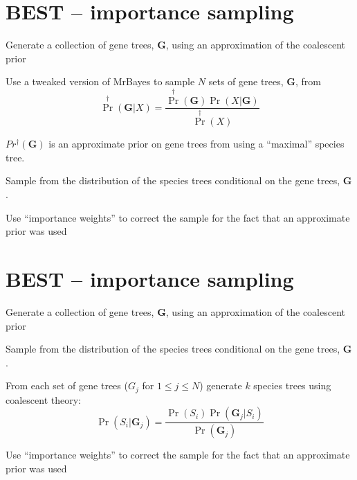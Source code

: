 \documentclass[landscape]{foils}
\begin{document}
\myNewSlide
\section*{BEST -- importance sampling}
\begin{compactenum}
	\item Generate a collection of gene trees, $\bm{G}$, using an approximation of the coalescent prior
		\begin{compactenum}
		\item Use a tweaked version of MrBayes to sample $N$ sets of gene trees, $\bm{G}$, from \[\Pr^{\dag}(\bm{G}|X) = \frac{\Pr^{\dag}(\bm{G})\Pr(X|\bm{G})}{\Pr^{\dag}(X)}\]
			\item $Pr^{\dag}(\bm{G})$ is an approximate prior on gene trees from using a ``maximal'' species tree.
		\end{compactenum}
	\item Sample from the distribution of the species trees conditional on the gene trees, $\bm{G}$.
	\item Use ``importance weights'' to correct the sample for the fact that an approximate prior was used
\end{compactenum}

\myNewSlide
\section*{BEST -- importance sampling}
\begin{compactenum}
	\item Generate a collection of gene trees, $\bm{G}$, using an approximation of the coalescent prior
	\item Sample from the distribution of the species trees conditional on the gene trees, $\bm{G}$.
		\begin{compactenum}
		\item From each set of gene trees (${G}_j$ for $1\leq j\leq N$) generate $k$ species trees using coalescent theory:
			 \[\Pr(S_i|\bm{G}_j) = \frac{\Pr(S_i)\Pr(\bm{G}_j|S_i)}{\Pr(\bm{G}_j)}\]
		\end{compactenum}
	\item Use ``importance weights'' to correct the sample for the fact that an approximate prior was used
\end{compactenum}

\myNewSlide
\end{document}
